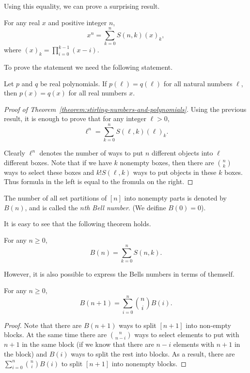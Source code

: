Using this equality, we can prove a surprising result.
\begin{theorem}
\label{theorem:stirling-numbers-and-polynomials}
  For any real $x$ and positive integer $n$,
  \[
    x^n = \sum_{k = 0}^n S(n, k) (x)_k,
  \]
  where $(x)_k = \prod_{i = 0}^{k - 1} (x - i)$.
\end{theorem}

To prove the statement we need the following statement.
\begin{theorem}
  Let $p$ and $q$ be real polynomials. If $p(\ell) = q(\ell)$ for all
  natural numbers $\ell$, then $p(x) = q(x)$ for all real numbers $x$.
\end{theorem}

\begin{proof}[Proof of Theorem~\ref{theorem:stirling-numbers-and-polynomials}]
  Using the previous result, it is enough to prove that
  for any integer $\ell > 0$,
  \[
    \ell^n = \sum_{k = 0}^n S(\ell, k) (\ell)_k.
  \]

  Clearly $\ell^n$ denotes the number of ways to put $n$ different
  objects into $\ell$ different boxes. Note that if we have $k$ nonempty
  boxes, then there are $\binom{n}{k}$ ways to select these boxes and
  $k! S(\ell, k)$ ways to put objects in these $k$ boxes. Thus formula in
  the left is equal to the fromula on the right.
\end{proof}

\begin{definition}
  The number of all set partitions of $[n]$ into nonempty parts
  is denoted by $B(n)$, and is called the \emph{$n$th Bell number}.
  (We deifine $B(0) = 0$).
\end{definition}


It is easy to see that the following theorem holds.
\begin{theorem}
  For any $n \ge 0$,
  \[
    B(n) = \sum_{k = 0}^n S(n, k).
  \]
\end{theorem}

However, it is also possible to express the Bells numbers in terms
of themself.
\begin{theorem}
  For any $n \ge 0$,
  \[
    B(n + 1) = \sum_{i = 0}^n \binom{n}{i} B(i).
  \]
\end{theorem}
\begin{proof}
  Note that there are $B(n + 1)$ ways to split $[n + 1]$ into
  non-empty blocks. At the same time there are $\binom{n}{n - i}$
  ways to select elements to put with $n + 1$ in the same block
  (if we know that there are $n - i$ elements with $n + 1$ in the block)
  and $B(i)$ ways to split the rest into blocks. As a result,
  there are $\sum_{i = 0}^n \binom{n}{i} B(i)$ to split $[n + 1]$
  into nonempty blocks.
\end{proof}

